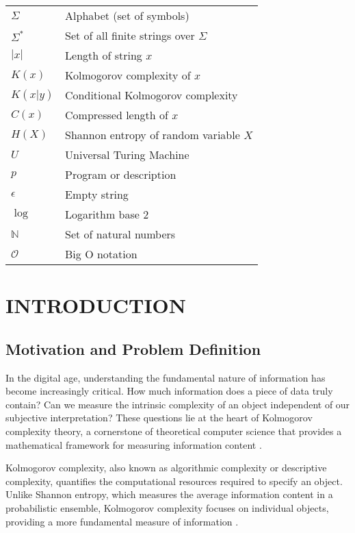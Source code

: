 \documentclass[12pt,a4paper]{report}
\begin{document}
\begin{tabular}{ll}
$\Sigma$ & Alphabet (set of symbols)\\
$\Sigma^*$ & Set of all finite strings over $\Sigma$\\
$|x|$ & Length of string $x$\\
$K(x)$ & Kolmogorov complexity of $x$\\
$K(x|y)$ & Conditional Kolmogorov complexity\\
$C(x)$ & Compressed length of $x$\\
$H(X)$ & Shannon entropy of random variable $X$\\
$U$ & Universal Turing Machine\\
$p$ & Program or description\\
$\epsilon$ & Empty string\\
$\log$ & Logarithm base 2\\
$\mathbb{N}$ & Set of natural numbers\\
$\mathcal{O}$ & Big O notation\\
\end{tabular}

\setcounter{page}{1}

\chapter{INTRODUCTION}

\section{Motivation and Problem Definition}

In the digital age, understanding the fundamental nature of information has become increasingly critical. How much information does a piece of data truly contain? Can we measure the intrinsic complexity of an object independent of our subjective interpretation? These questions lie at the heart of Kolmogorov complexity theory, a cornerstone of theoretical computer science that provides a mathematical framework for measuring information content \cite{li2008introduction}.

Kolmogorov complexity, also known as algorithmic complexity or descriptive complexity, quantifies the computational resources required to specify an object. Unlike Shannon entropy, which measures the average information content in a probabilistic ensemble, Kolmogorov complexity focuses on individual objects, providing a more fundamental measure of information \cite{kolmogorov1965three}.
\end{document}
